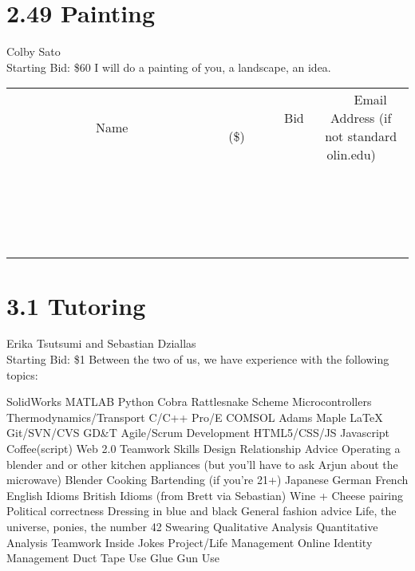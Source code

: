 \documentclass[11pt]{article}
\begin{document}
\section*{2.49 Painting}
Colby Sato
\\
Starting Bid: \$60
\newline
I will do a painting of you, a landscape, an idea.
\\[3ex]
\begin{tabular}{c c c}
~~~~~~~~~~~~~Name~~~~~~~~~~~~~ & ~~~~~~~~~Bid (\$)~~~~~~~~~  & ~~~Email Address (if not standard olin.edu)~~~\\
 & & \\
\hline
 & & \\
\hline
 & & \\
\hline
 & & \\
\hline
 & & \\
\hline
 & & \\
\hline
 & & \\
\hline
 & & \\
\hline
 & & \\
\hline
 & & \\
\hline
 & & \\
\hline
 & & \\
\hline
 & & \\
\hline
 & & \\
\hline
 & & \\
\hline
 & & \\
\hline
 & & \\
\hline
 & & \\
\hline
 & & \\
\hline
\end{tabular}
\newpage
\section*{3.1 Tutoring}
Erika Tsutsumi and Sebastian Dziallas
\\
Starting Bid: \$1
\newline
Between the two of us, we have experience with the following topics:

SolidWorks
MATLAB
Python
Cobra
Rattlesnake
Scheme
Microcontrollers
Thermodynamics/Transport
C/C++
Pro/E
COMSOL
Adams
Maple
LaTeX
Git/SVN/CVS
GD\&T
Agile/Scrum Development
HTML5/CSS/JS
Javascript
Coffee(script)
Web  2.0
Teamwork Skills
Design
Relationship Advice
Operating a blender and or other kitchen appliances (but you'll have to ask Arjun about the microwave)
Blender
Cooking
Bartending (if you're 21+)
Japanese
German
French
English Idioms
British Idioms (from Brett via Sebastian)
Wine + Cheese pairing
Political correctness
Dressing in blue and black
General fashion advice
Life, the universe, ponies, the number 42
Swearing
Qualitative Analysis
Quantitative Analysis 
Teamwork
Inside Jokes
Project/Life Management
Online Identity Management
Duct Tape Use
Glue Gun Use
\end{document}
